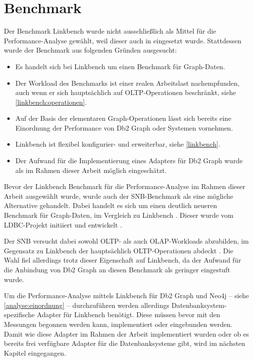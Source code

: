 \section{Benchmark}
\label{analyse:benchmark}
Der Benchmark Linkbench wurde nicht ausschließlich als Mittel für die Performance-Analyse gewählt, weil dieser auch in \cite{sigmod_tian} eingesetzt wurde. Stattdessen wurde der Benchmark aus folgenden Gründen ausgesucht:
\begin{itemize}
    \item Es handelt sich bei Linkbench um einen Benchmark für Graph-Daten.
    \item Der Workload des Benchmarks ist einer realen Arbeitslast nachempfunden, auch wenn er sich hauptsächlich auf OLTP-Operationen beschränkt, siehe \autoref{linkbench:operationen}. 
    \item Auf der Basis der elementaren Graph-Operationen lässt sich bereits eine Einordnung der Performance von Db2 Graph oder Systemen vornehmen. 
    \item Linkbench ist flexibel konfigurier- und erweiterbar, siehe \autoref{linkbench}. 
    \item Der Aufwand für die Implementierung eines Adapters für Db2 Graph wurde als im Rahmen dieser Arbeit möglich eingeschätzt.
\end{itemize}
Bevor der Linkbench Benchmark für die Performance-Analyse im Rahmen dieser Arbeit ausgewählt wurde, wurde auch der SNB-Benchmark als eine mögliche Alternative gehandelt. Dabei handelt es sich um einen deutlich neueren Benchmark für Graph-Daten, im Vergleich zu Linkbench \cite{snb_paper}. Dieser wurde vom LDBC-Projekt initiiert und entwickelt \cite{snb_paper}. 

Der SNB versucht dabei sowohl OLTP- als auch OLAP-Workloads abzubilden, im Gegensatz zu Linkbench der hauptsächlich OLTP-Operationen abdeckt \cite{snb_paper}. Die Wahl fiel allerdings trotz dieser Eigenschaft auf  Linkbench, da der Aufwand für die Anbindung von Db2 Graph an diesen Benchmark als geringer eingestuft wurde.

Um die Performance-Analyse mittels Linkbench für Db2 Graph und Neo4j -- siehe \autoref{analyse:einordnung} -- durchzuführen werden allerdings Datenbanksystem-spezifische Adapter für Linkbench benötigt. Diese müssen bevor mit den Messungen begonnen werden kann, implementiert oder eingebunden werden. Damit wie diese Adapter im Rahmen der Arbeit implementiert wurden oder ob es bereits frei verfügbare Adapter für die Datenbanksysteme gibt, wird im nächsten Kapitel  eingegangen. 


